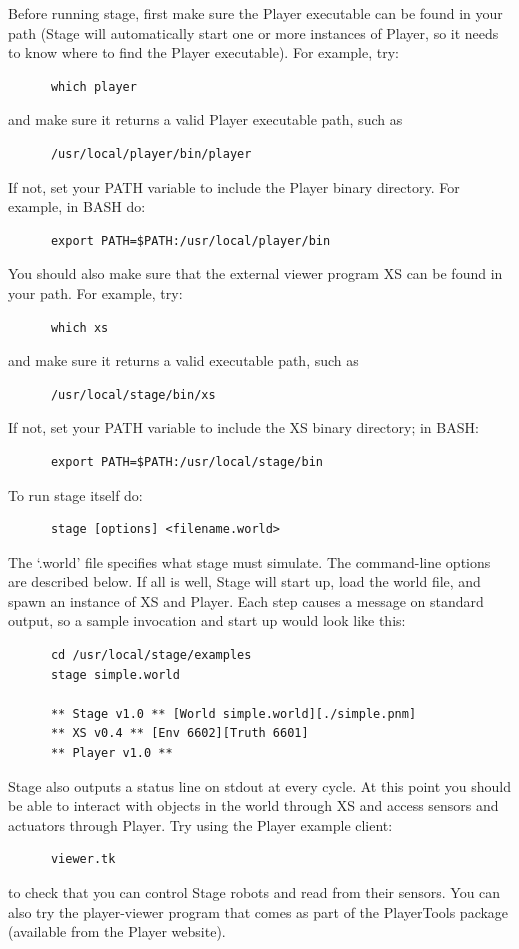 \documentclass[11pt]{report}
\begin{document}
    Before running stage, first make sure the Player executable can be
    found in your path (Stage will automatically start one or more
    instances of Player, so it needs to know where to find the Player
    executable).
    For example, try:
      \begin{verbatim}
      which player
      \end{verbatim}
    and make sure it returns a valid Player executable path, such as
      \begin{verbatim}
      /usr/local/player/bin/player
      \end{verbatim}
    If not, set your PATH variable to include the Player binary directory. 
    For example, in BASH do:
      \begin{verbatim}  
      export PATH=$PATH:/usr/local/player/bin
      \end{verbatim}  
    You should also make sure that the external viewer program XS
    can be found in your path.
    For example, try:
      \begin{verbatim}
      which xs
      \end{verbatim}
    and make sure it returns a valid executable path, such as
      \begin{verbatim}
      /usr/local/stage/bin/xs
      \end{verbatim}
    If not, set your PATH variable to include the XS binary directory;
    in BASH:
      \begin{verbatim}  
      export PATH=$PATH:/usr/local/stage/bin
      \end{verbatim}  
    To run stage itself do: 
      \begin{verbatim} 
      stage [options] <filename.world> 
      \end{verbatim} 
    The `.world' file specifies what stage must simulate. The
    command-line options are described below. If all is well, Stage
    will start up, load the world file, and spawn an instance of XS
    and Player. Each step causes a message on standard output, so a
    sample invocation and start up would look like this:
      \begin{verbatim}
      cd /usr/local/stage/examples
      stage simple.world 
 
      ** Stage v1.0 ** [World simple.world][./simple.pnm]        
      ** XS v0.4 ** [Env 6602][Truth 6601]
      ** Player v1.0 **
      \end{verbatim}
    Stage also outputs a status line on stdout at every cycle.  At
    this point you should be able to interact with objects in the
    world through XS and access sensors and actuators through
    Player. 
    Try using the Player example client:
      \begin{verbatim}
      viewer.tk
      \end{verbatim}
    to check that you can control Stage robots and read from their
    sensors. 
    You can also try the player-viewer program that comes as part of the
    PlayerTools package (available from the Player website).
\end{document}

